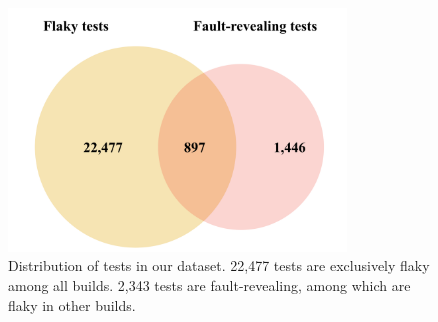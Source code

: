 
\begin{figure}[!htbp]
\centering
\includegraphics[width=0.8\textwidth]{figures/chromium/venn.png}
\vspace{-1em}
\caption{Distribution of tests in our dataset. 22,477 tests are exclusively flaky among all builds. 2,343 tests are fault-revealing, among which  are flaky in other builds.}
\label{fig:venn}
\vspace{-0.7em}
\end{figure}

